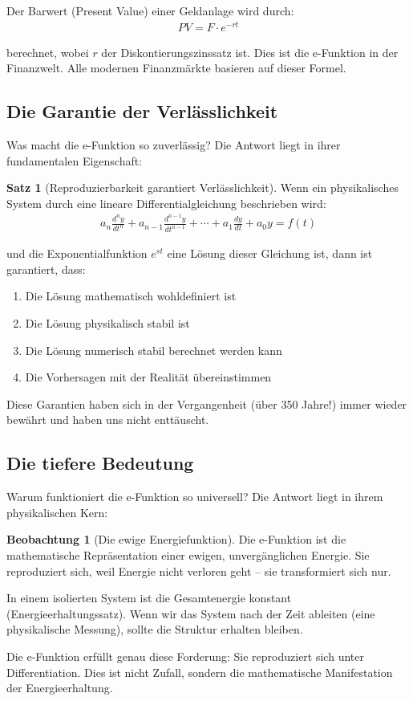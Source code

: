 \documentclass[a4paper,12pt,twoside]{report}
\theoremstyle{definition}
\newtheorem{satz}{Satz}
\newtheorem{beobachtung}{Beobachtung}
\begin{document}
Der Barwert (Present Value) einer Geldanlage wird durch:
\begin{align}
	PV = F \cdot e^{-rt}
\end{align}

berechnet, wobei $r$ der Diskontierungszinssatz ist. Dies ist die e-Funktion in der Finanzwelt. Alle modernen Finanzmärkte basieren auf dieser Formel.

\subsection{Die Garantie der Verlässlichkeit}

Was macht die e-Funktion so zuverlässig? Die Antwort liegt in ihrer fundamentalen Eigenschaft:

\begin{satz}[Reproduzierbarkeit garantiert Verlässlichkeit]
	Wenn ein physikalisches System durch eine lineare Differentialgleichung beschrieben wird:
	\begin{align}
		a_n \frac{d^n y}{dt^n} + a_{n-1} \frac{d^{n-1} y}{dt^{n-1}} + \cdots + a_1 \frac{dy}{dt} + a_0 y = f(t)
	\end{align}
	
	und die Exponentialfunktion $e^{st}$ eine Lösung dieser Gleichung ist, dann ist garantiert, dass:
	
	\begin{enumerate}
		\item Die Lösung mathematisch wohldefiniert ist
		\item Die Lösung physikalisch stabil ist
		\item Die Lösung numerisch stabil berechnet werden kann
		\item Die Vorhersagen mit der Realität übereinstimmen
	\end{enumerate}
	
	Diese Garantien haben sich in der Vergangenheit (über 350 Jahre!) immer wieder bewährt und haben uns nicht enttäuscht.
\end{satz}

\subsection{Die tiefere Bedeutung}

Warum funktioniert die e-Funktion so universell? Die Antwort liegt in ihrem physikalischen Kern:

\begin{beobachtung}[Die ewige Energiefunktion]
	Die e-Funktion ist die mathematische Repräsentation einer ewigen, unvergänglichen Energie. Sie reproduziert sich, weil Energie nicht verloren geht -- sie transformiert sich nur.
	
	In einem isolierten System ist die Gesamtenergie konstant (Energieerhaltungssatz). Wenn wir das System nach der Zeit ableiten (eine physikalische Messung), sollte die Struktur erhalten bleiben.
	
	Die e-Funktion erfüllt genau diese Forderung: Sie reproduziert sich unter Differentiation. Dies ist nicht Zufall, sondern die mathematische Manifestation der Energieerhaltung.
\end{beobachtung}
\end{document}

